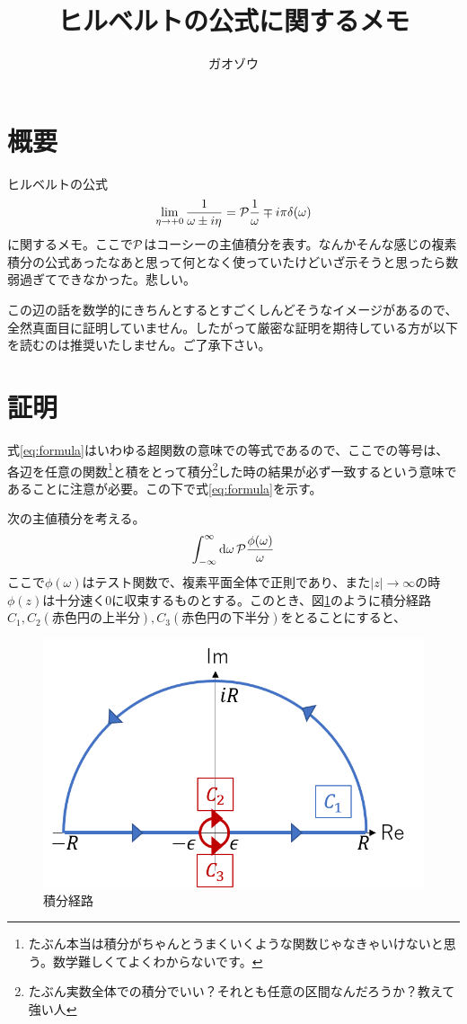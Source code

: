 \documentclass[uplatex,dvipdfmx]{jsarticle}
\title{ヒルベルトの公式に関するメモ}
\author{ガオゾウ}
\begin{document}
\maketitle
\section{概要}
ヒルベルトの公式
\begin{equation}
	\lim_{\eta \to +0}\frac{1}{\omega \pm i\eta} = \pv{\frac{1}{\omega}} \mp i\pi \delta(\omega) \label{eq:formula}
\end{equation}
に関するメモ。ここで$\pv$はコーシーの主値積分を表す。なんかそんな感じの複素積分の公式あったなあと思って何となく使っていたけどいざ示そうと思ったら数弱過ぎてできなかった。悲しい。

この辺の話を数学的にきちんとするとすごくしんどそうなイメージがあるので、全然真面目に証明していません。したがって厳密な証明を期待している方が以下を読むのは推奨いたしません。ご了承下さい。

\section{証明}
式\eqref{eq:formula}はいわゆる超関数の意味での等式であるので、ここでの等号は、各辺を任意の関数\footnote{たぶん本当は積分がちゃんとうまくいくような関数じゃなきゃいけないと思う。数学難しくてよくわからないです。}と積をとって積分\footnote{たぶん実数全体での積分でいい？それとも任意の区間なんだろうか？教えて強い人}した時の結果が必ず一致するという意味であることに注意が必要。この下で式\eqref{eq:formula}を示す。

次の主値積分を考える。
\begin{equation}
	\int_{-\infty}^{\infty} \dd{\omega} \pv{ \frac{\phi(\omega)}{\omega}}
\end{equation}
ここで$\phi(\omega)$はテスト関数で、複素平面全体で正則であり、また$|z|\to \infty$の時$\phi(z)$は十分速く$0$に収束するものとする。このとき、図\ref{fig:contour}のように積分経路$C_1, C_2(赤色円の上半分), C_3(赤色円の下半分)$をとることにすると、
\begin{figure}
	\centering
	\includegraphics{contour.png}
	\caption{積分経路}
	\label{fig:contour}
\end{figure}
\end{document}

